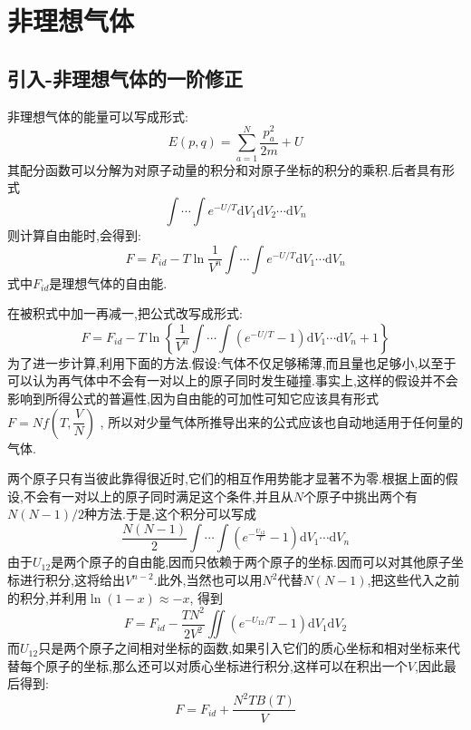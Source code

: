 
\section{非理想气体}
\subsection{引入-非理想气体的一阶修正}

  非理想气体的能量可以写成形式:
  \begin{equation}
    E(p,q)=\sum_{a=1}^{N} \dfrac{p_a^{2}}{2m}+U
  \end{equation}
  其配分函数可以分解为对原子动量的积分和对原子坐标的积分的乘积.后者具有形式
  \[\int \cdots \int e^{-U / T}\mathrm{d} V_1 \mathrm{d} V_2 \cdots \mathrm{d} V_n\]
  则计算自由能时,会得到:
  \begin{equation}
    F=F_{id}-T\ln \frac{1}{V^{n}}\int\cdots \int e^{-U / T}\mathrm{d} V_1 \cdots \mathrm{d}  V_n
  \end{equation}
  式中$F_{id}$是理想气体的自由能.

  在被积式中加一再减一,把公式改写成形式:
  \begin{equation}
    F=F_{id}-T\ln\left\{ \frac{1}{V^{n}} \int \cdots \int (e^{-U / T}-1)\mathrm{d} V_1 \cdots\mathrm{d} V_n +1 \right\} 
  \end{equation}
  为了进一步计算,利用下面的方法.假设:气体不仅足够稀薄,而且量也足够小,以至于可以认为再气体中不会有一对以上的原子同时发生碰撞.事实上,这样的假设并不会影响到所得公式的普遍性,因为自由能的可加性可知它应该具有形式$F=N f\left( T,\dfrac{V}{N} \right) $ , 所以对少量气体所推导出来的公式应该也自动地适用于任何量的气体.

  两个原子只有当彼此靠得很近时,它们的相互作用势能才显著不为零.根据上面的假设,不会有一对以上的原子同时满足这个条件,并且从$N$个原子中挑出两个有$N(N-1)/2$种方法.于是,这个积分可以写成
  \[\dfrac{N(N-1)}{2}\int \cdots \int (e^{-\frac{U_{12}}{T}}-1)\mathrm{d} V_1 \cdots\mathrm{d} V_n\]
  由于$U_{12}$是两个原子的自由能,因而只依赖于两个原子的坐标.因而可以对其他原子坐标进行积分,这将给出$V^{n-2}$.此外,当然也可以用$N^{2}$代替$N(N-1)$,把这些代入之前的积分,并利用$\ln(1-x)\approx -x$, 得到
  \begin{equation}
    F=F_{id}-\dfrac{TN^{2}}{2V^{2}} \iint (e^{-U_{12} / T}-1)\mathrm{d} V_1 \mathrm{d} V_2
  \end{equation}
  而$U_{12}$只是两个原子之间相对坐标的函数,如果引入它们的质心坐标和相对坐标来代替每个原子的坐标,那么还可以对质心坐标进行积分,这样可以在积出一个$V$,因此最后得到:
  \begin{equation}
    F=F_{id}+\dfrac{N^{2}TB(T)}{V}
  \end{equation}
  
